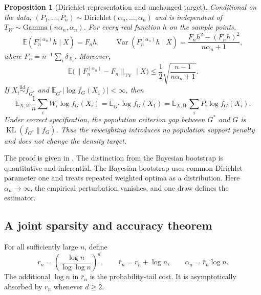 \documentclass[11pt]{article}
\newtheorem{proposition}[theorem]{Proposition}
\theoremstyle{definition}
\theoremstyle{remark}
\DeclareMathOperator{\KL}{KL}
\DeclareMathOperator{\TV}{TV}
\newcommand{\EE}{\mathbb E}
\newcommand{\norm}[1]{\lVert #1\rVert}
\newcommand{\abs}[1]{\lvert #1\rvert}
\begin{document}
\begin{proposition}[Dirichlet representation and unchanged target]
\label{prop:dirichlet}
Conditional on the data,
$(P_1,\ldots,P_n)\sim\mathrm{Dirichlet}(\alpha_n,\ldots,\alpha_n)$ and is
independent of $T_W\sim\mathrm{Gamma}(n\alpha_n,\alpha_n)$.  For every real
function $h$ on the sample points,
\[
 \EE(F_n^{(\alpha_n)}h\mid X)=F_nh,
 \qquad
 \operatorname{Var}(F_n^{(\alpha_n)}h\mid X)
 =\frac{F_nh^2-(F_nh)^2}{n\alpha_n+1},
\]
where $F_n=n^{-1}\sum_i\delta_{X_i}$.  Moreover,
\[
 \EE\bigl(\norm{F_n^{(\alpha_n)}-F_n}_{\TV}\mid X\bigr)
 \le \frac12\sqrt{\frac{n-1}{n\alpha_n+1}}.
\]
If $X_i\stackrel{\mathrm{iid}}\sim f_{G^*}$ and
$\EE_{G^*}\abs{\log f_G(X_1)}<\infty$, then
\[
 \EE_{X,W}\frac1n\sum_iW_i\log f_G(X_i)
 =\EE_{G^*}\log f_G(X_1)
 =\EE_{X,W}\sum_iP_i\log f_G(X_i).
\]
Under correct specification, the population criterion gap between $G^*$ and
$G$ is $\KL(f_{G^*}\|f_G)$.  Thus the reweighting introduces no population
support penalty and does not change the density target.
\end{proposition}

The proof is given in .  The distinction from the
Bayesian bootstrap is quantitative and inferential.  The Bayesian bootstrap
uses common Dirichlet parameter one and treats repeated weighted optima as a
distribution.  Here $\alpha_n\to\infty$, the empirical perturbation vanishes,
and one draw defines the estimator.

\subsection{A joint sparsity and accuracy theorem}

For all sufficiently large $n$, define
\begin{equation}\label{eq:scales}
 r_n=\left(\frac{\log n}{\log\log n}\right)^d,
 \qquad \bar r_n=r_n+\log n,
 \qquad \alpha_n=\bar r_n\log n.
\end{equation}
The additional $\log n$ in $\bar r_n$ is the probability-tail cost.  It is
asymptotically absorbed by $r_n$ whenever $d\ge2$.
\end{document}
